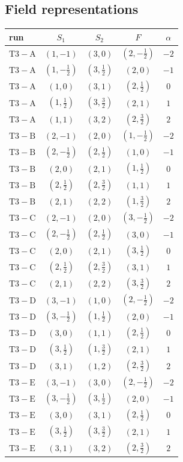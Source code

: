 \documentclass[9pt]{article}
\begin{document}
\subsection*{Field representations}
\begin{longtable}{@{}lcccc@{}}
\toprule
run & $S_1$ & $S_2$ & $F$ & $\alpha$ \\
\midrule
$\mathrm{T3-A}$ & $(1,-1)$ & $(3,0)$ & $(2,- \frac{1}{2})$ & $-2$ \\
$\mathrm{T3-A}$ & $(1,- \frac{1}{2})$ & $(3,\frac{1}{2})$ & $(2,0)$ & $-1$ \\
$\mathrm{T3-A}$ & $(1,0)$ & $(3,1)$ & $(2,\frac{1}{2})$ & $0$ \\
$\mathrm{T3-A}$ & $(1,\frac{1}{2})$ & $(3,\frac{3}{2})$ & $(2,1)$ & $1$ \\
$\mathrm{T3-A}$ & $(1,1)$ & $(3,2)$ & $(2,\frac{3}{2})$ & $2$ \\
$\mathrm{T3-B}$ & $(2,-1)$ & $(2,0)$ & $(1,- \frac{1}{2})$ & $-2$ \\
$\mathrm{T3-B}$ & $(2,- \frac{1}{2})$ & $(2,\frac{1}{2})$ & $(1,0)$ & $-1$ \\
$\mathrm{T3-B}$ & $(2,0)$ & $(2,1)$ & $(1,\frac{1}{2})$ & $0$ \\
$\mathrm{T3-B}$ & $(2,\frac{1}{2})$ & $(2,\frac{3}{2})$ & $(1,1)$ & $1$ \\
$\mathrm{T3-B}$ & $(2,1)$ & $(2,2)$ & $(1,\frac{3}{2})$ & $2$ \\
$\mathrm{T3-C}$ & $(2,-1)$ & $(2,0)$ & $(3,- \frac{1}{2})$ & $-2$ \\
$\mathrm{T3-C}$ & $(2,- \frac{1}{2})$ & $(2,\frac{1}{2})$ & $(3,0)$ & $-1$ \\
$\mathrm{T3-C}$ & $(2,0)$ & $(2,1)$ & $(3,\frac{1}{2})$ & $0$ \\
$\mathrm{T3-C}$ & $(2,\frac{1}{2})$ & $(2,\frac{3}{2})$ & $(3,1)$ & $1$ \\
$\mathrm{T3-C}$ & $(2,1)$ & $(2,2)$ & $(3,\frac{3}{2})$ & $2$ \\
$\mathrm{T3-D}$ & $(3,-1)$ & $(1,0)$ & $(2,- \frac{1}{2})$ & $-2$ \\
$\mathrm{T3-D}$ & $(3,- \frac{1}{2})$ & $(1,\frac{1}{2})$ & $(2,0)$ & $-1$ \\
$\mathrm{T3-D}$ & $(3,0)$ & $(1,1)$ & $(2,\frac{1}{2})$ & $0$ \\
$\mathrm{T3-D}$ & $(3,\frac{1}{2})$ & $(1,\frac{3}{2})$ & $(2,1)$ & $1$ \\
$\mathrm{T3-D}$ & $(3,1)$ & $(1,2)$ & $(2,\frac{3}{2})$ & $2$ \\
$\mathrm{T3-E}$ & $(3,-1)$ & $(3,0)$ & $(2,- \frac{1}{2})$ & $-2$ \\
$\mathrm{T3-E}$ & $(3,- \frac{1}{2})$ & $(3,\frac{1}{2})$ & $(2,0)$ & $-1$ \\
$\mathrm{T3-E}$ & $(3,0)$ & $(3,1)$ & $(2,\frac{1}{2})$ & $0$ \\
$\mathrm{T3-E}$ & $(3,\frac{1}{2})$ & $(3,\frac{3}{2})$ & $(2,1)$ & $1$ \\
$\mathrm{T3-E}$ & $(3,1)$ & $(3,2)$ & $(2,\frac{3}{2})$ & $2$ \\
\bottomrule
\end{longtable}
\end{document}
